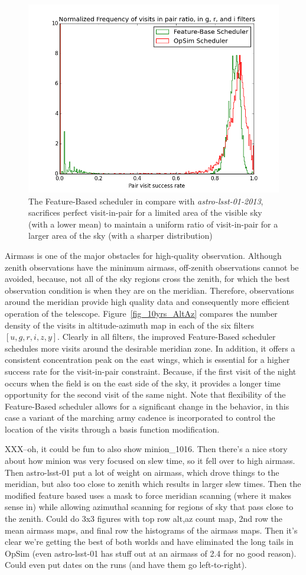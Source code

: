 \documentclass[12pt]{aastex62}
\theoremstyle{definition}
\begin{document}
\begin{figure}[h!]
\centering
\includegraphics[width=.5\linewidth]{Figures/PairHist.png}
\caption{The Feature-Based scheduler in compare with \textit{astro-lsst-01-2013}, sacrifices perfect visit-in-pair for a limited area of the visible sky (with a lower mean) to maintain a uniform ratio of visit-in-pair for a larger area of the sky (with a sharper distribution)}
\label{fig_10yrs_pair_hist}
\end{figure}

Airmass is one of the major obstacles for high-quality observation. Although zenith observations have the minimum airmass, off-zenith observations cannot be avoided, because, not all of the sky regions cross the zenith, for which the best observation condition is when they are on the meridian. Therefore, observations around the meridian provide high quality data and consequently more efficient operation of the telescope. Figure~\ref{fig_10yrs_AltAz} compares the number density of the visits in altitude-azimuth map in each of the six filters $[u,g,r,i,z,y]$. Clearly in all filters, the improved Feature-Based scheduler schedules more visits around the desirable meridian zone. In addition, it offers a consistent concentration peak on the east wings, which is essential for a higher success rate for the visit-in-pair constraint. Because, if the first visit of the night occurs when the field is on the east side of the sky, it provides a longer time opportunity for the second visit of the same night. Note that flexibility of the Feature-Based scheduler allows for a significant change in the behavior, in this case a variant of the marching army cadence is incorporated to control the location of the visits through a basis function modification.

XXX--oh, it could be fun to also show minion\_1016. Then there's a nice story about how minion was very focused on slew time, so it fell over to high airmass. Then astro-lsst-01 put a lot of weight on airmass, which drove things to the meridian, but also too close to zenith which results in larger slew times. Then the modified feature based uses a mask to force meridian scanning (where it makes sense in) while allowing azimuthal scanning for regions of sky that pass close to the zenith. Could do 3x3 figures with top row alt,az count map, 2nd row the mean airmass maps, and final row the histograms of the airmass maps. Then it's clear we're getting the best of both worlds and have eliminated the long tails in OpSim (even astro-lsst-01 has stuff out at an airmass of 2.4 for no good reason). Could even put dates on the runs (and have them go left-to-right).
\end{document}

